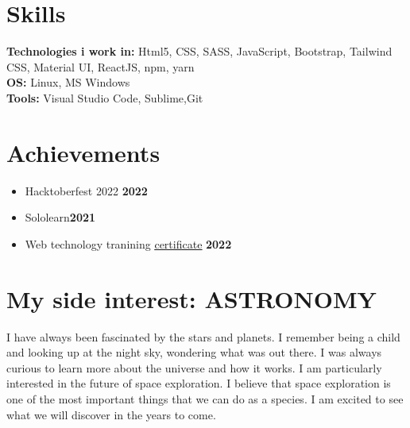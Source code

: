 \documentclass[letterpaper, 11pt]{article}
\newcommand{\secStartSpace}{\vspace{3pt}}
\newcommand{\secEndSpace}{\vspace{5pt}}
\begin{document}
\section{\color{blue} \textbf{Skills}}
\secStartSpace

\begin{addmargin}[1em]{1em}
	\noindent \textbf{Technologies i work in:} Html5, CSS, SASS, JavaScript, Bootstrap, Tailwind CSS, Material UI, ReactJS, npm, yarn \\
	\noindent \textbf{OS:} Linux, MS Windows\\
	\noindent \textbf{Tools:} Visual Studio Code, Sublime,Git
\end{addmargin}
\secEndSpace


\section{\color{blue} \textbf{Achievements}}
\secStartSpace

\begin{addmargin}[1em]{1em}
	\begin{itemize}[itemsep=-2.25pt]
		\item Hacktoberfest 2022 \hfill  \textbf{2022}
		\item Sololearn\hfill \textbf{2021}
             \item Web technology tranining \href{https://drive.google.com/file/d/1dvMJvl1GO1latdqQqoEhMXfEIaUzRKfI/view?usp=drivesdk}{\underline{certificate}} \hfill \textbf{2022}
	\end{itemize}
\end{addmargin}




\newpage
\section{\color{blue} \textbf{My side interest: ASTRONOMY}}

\secStartSpace
I have always been fascinated by the stars and planets. I remember being a child and looking up at the night sky, wondering what was out there. I was always curious to learn more about the universe and how it works.
I am particularly interested in the future of space exploration. I believe that space exploration is one of the most important things that we can do as a species. I am excited to see what we will discover in the years to come.
\secEndSpace
\end{document}
